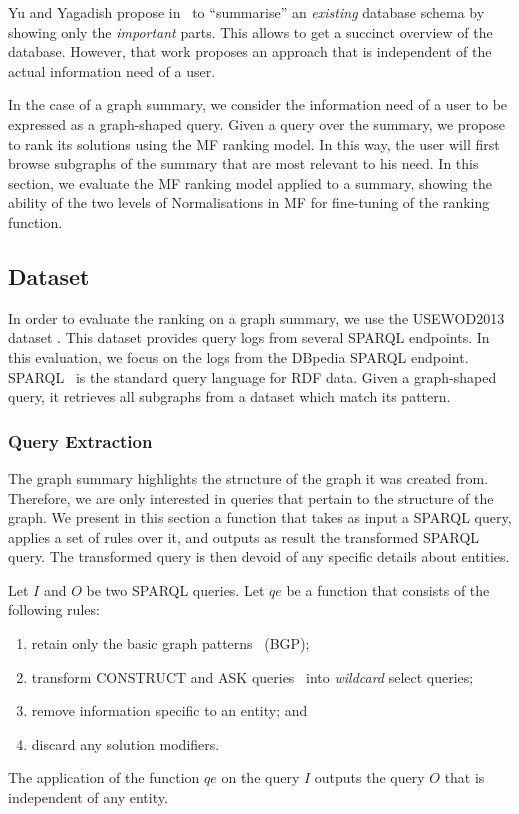 Yu and Yagadish propose in~\cite{yu:2006:schema-summarization} to ``summarise'' an \emph{existing} database schema by showing only the \emph{important} parts. This allows to get a succinct overview of the database.
However, that work proposes an approach that is independent of the actual information need of a user.

In the case of a graph summary, we consider the information need of a user to be expressed as a graph-shaped query. Given a query over the summary, we propose to rank its solutions using the \gls{MF} ranking model. In this way, the user will first browse subgraphs of the summary that are most relevant to his need. In this section, we evaluate the \gls{MF} ranking model applied to a summary, showing the ability of the two levels of Normalisations in \gls{MF} for fine-tuning of the ranking function.

\subsection{Dataset}
\label{sec:summary-ranking:dataset}

In order to evaluate the ranking on a graph summary, we use the USEWOD2013 dataset \cite{usewod:2013}. This dataset provides query logs from several SPARQL endpoints. In this evaluation, we focus on the logs from the DBpedia SPARQL endpoint. SPARQL~\cite{PrudS08} is the standard query language for RDF data. Given a graph-shaped query, it retrieves all subgraphs from a dataset which match its pattern.

\subsubsection{Query Extraction}

The graph summary highlights the structure of the graph it was created from. Therefore, we are only interested in queries that pertain to the structure of the graph. We present in this section a function that takes as input a SPARQL query, applies a set of rules over it, and outputs as result the transformed SPARQL query. The transformed query is then devoid of any specific details about entities.

\begin{definition}
Let $I$ and $O$ be two SPARQL queries. Let $qe$ be a function that consists of the following rules:
\begin{enumerate}
	\item retain only the basic graph patterns~\cite{PrudS08} (BGP);
	\item transform CONSTRUCT and ASK queries~\cite{PrudS08} into \emph{wildcard} select queries;
	\item remove information specific to an entity; and
	\item discard any solution modifiers.
\end{enumerate}
The application of the function $qe$ on the query $I$ outputs the query $O$ that is independent of any entity.
\label{def:query-extraction-function}
\end{definition}

